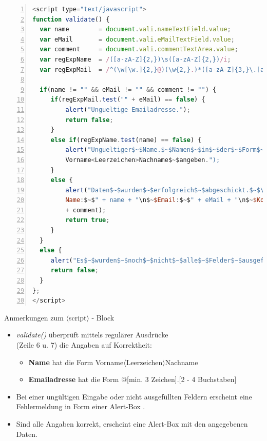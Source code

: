 \tiny{
\begin{lstlisting}[language = JavaScript,
				   mathescape = true, 
                   numbers = left, 
                   numbersep = 3pt]
<script type="text/javascript">
function validate() {
  var name        = document.vali.nameTextField.value;
  var eMail       = document.vali.eMailTextField.value;
  var comment     = document.vali.commentTextArea.value;
  var regExpName  = /([a-zA-Z]{2,})\s([a-zA-Z]{2,})/i;
  var regExpMail  = /^(\w[\w.]{2,}@)(\w{2,}.)*([a-zA-Z]{3,}\.[a-zA-Z]{2,4})/$\$$i;
	
  if(name != "" && eMail != "" && comment != "") {
	 if(regExpMail.test("" + eMail) == false) {
		 alert("Ungueltige Emailadresse.");
		 return false;
	 }
	 else if(regExpName.test(name) == false) {
		 alert("Ungueltiger$~$Name.$~$Namen$~$in$~$der$~$Form$~$\n$~$
		 Vorname<Leerzeichen>Nachname$~$angeben.");
	 }	
	 else { 
		 alert("Daten$~$wurden$~$erfolgreich$~$abgeschickt.$~$\n$~$Ihre$~$Daten:$~$\n$~$
		 Name:$~$" + name + "\n$~$Email:$~$" + eMail + "\n$~$Kommentar:$~$" 
		 + comment);	
		 return true;	
	 }
  }
  else {
	 alert("Es$~$wurden$~$noch$~$nicht$~$alle$~$Felder$~$ausgefuellt.");
	 return false;
  }
};
</script>
\end{lstlisting}}

\begin{frame}{Anmerkungen zum $\langle$script$\rangle$ - Block}
\small{
\begin{itemize}
\item {\it validate()} überprüft mittels regulärer Ausdrücke\\ (Zeile 6 u. 7) die Angaben auf Korrektheit:
	\begin{itemize}
	\item {\bf Name} hat die Form Vorname$\langle$Leerzeichen$\rangle$Nachname
	\item {\bf Emailadresse} hat die Form @[min. 3 Zeichen].[2 - 4 Buchstaben]
	\end{itemize}
\item Bei einer ungültigen Eingabe oder nicht ausgefüllten Feldern erscheint eine Fehlermeldung in Form einer Alert-Box .
\item Sind alle Angaben korrekt, erscheint eine Alert-Box mit den angegebenen Daten.
\end{itemize}}
\end{frame}
